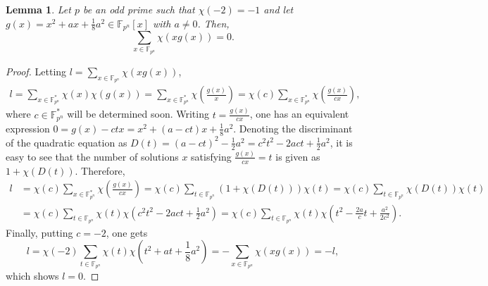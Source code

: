 \documentclass[11pt]{article}
\numberwithin{theorem}{section}
\newtheorem{lemma}[theorem]{Lemma}
\newcommand{\Fpn}{\mathbb{F}_{p^n}}
\newcommand{\Fpnmul}{\mathbb{F}_{p^n}^*}
\begin{document}
	\begin{lemma}\label{supersingular_lemma}
		Let $p$  be an odd prime such that $\chi(-2)=-1$ and let $g(x)=x^2+ax+\frac18a^2 \in \Fpn[x]$ with $a\neq 0$. Then, 
		$$
		\sum_{x\in \Fpn} \chi (xg(x))=0.
		$$
	\end{lemma}
	
	\begin{proof}
		Letting $l=\sum_{x\in \Fpn} \chi (xg(x))$, 
		\begin{align*}
			l=\sum_{x\in \Fpnmul} \chi (x)\chi(g(x))= \sum_{x\in \Fpnmul} \chi\left(\frac{g(x)}{x}\right) =\chi(c) \sum_{x\in \Fpnmul} \chi\left(\frac{g(x)}{cx}\right),
		\end{align*}
		where $c\in \Fpnmul$ will be determined soon. Writing $t=\frac{g(x)}{cx}$, one has an equivalent expression $0=g(x)-ctx=x^2+(a-ct)x+\frac18a^2$. Denoting the discriminant of the quadratic equation as $D(t)=(a-ct)^2-\frac12a^2=c^2t^2-2act+\frac12a^2$, it is easy to see that the number of solutions $x$ satisfying $\frac{g(x)}{cx}=t$ is given as $1+\chi(D(t))$. Therefore, 
		\begin{align*}
			l&=\chi(c) \sum_{x\in \Fpnmul} \chi\left(\frac{g(x)}{cx}\right)=\chi(c) \sum_{t\in \Fpn} \left(1+\chi(D(t))\right)\chi(t)
			=\chi(c)\sum_{t\in \Fpn}\chi(D(t))\chi(t) \\
			&=\chi(c)\sum_{t\in \Fpn}\chi(t) \chi\left(c^2t^2-2act+\frac12a^2\right)=\chi(c)\sum_{t\in \Fpn}\chi(t) \chi\left(t^2-\frac{2a}{c}t+\frac{a^2}{2c^2}\right).
		\end{align*}
		Finally, putting $c=-2$, one gets 
		$$
		l=\chi(-2)\sum_{t\in \Fpn}\chi(t)\chi\left(t^2+at+\frac18a^2\right)=-\sum_{x\in \Fpn}\chi(xg(x))=-l,
		$$
		which shows $l=0$.
	\end{proof}
	
\end{document}
